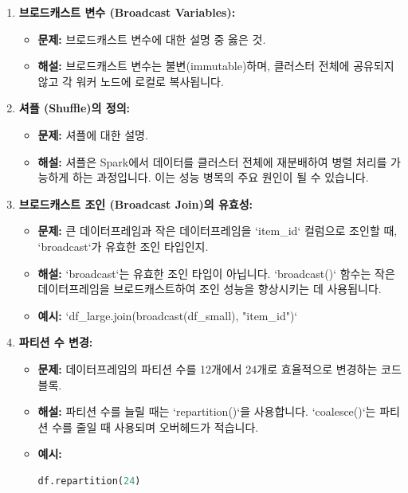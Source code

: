 \documentclass[11pt,a4paper]{article}
\begin{document}
\begin{enumerate}
    \item \textbf{브로드캐스트 변수 (Broadcast Variables):}
    \begin{itemize}
        \item \textbf{문제:} 브로드캐스트 변수에 대한 설명 중 옳은 것.
        \item \textbf{해설:} 브로드캐스트 변수는 불변(immutable)하며, 클러스터 전체에 공유되지 않고 각 워커 노드에 로컬로 복사됩니다.
    \end{itemize}

    \item \textbf{셔플 (Shuffle)의 정의:}
    \begin{itemize}
        \item \textbf{문제:} 셔플에 대한 설명.
        \item \textbf{해설:} 셔플은 Spark에서 데이터를 클러스터 전체에 재분배하여 병렬 처리를 가능하게 하는 과정입니다. 이는 성능 병목의 주요 원인이 될 수 있습니다.
    \end{itemize}

    \item \textbf{브로드캐스트 조인 (Broadcast Join)의 유효성:}
    \begin{itemize}
        \item \textbf{문제:} 큰 데이터프레임과 작은 데이터프레임을 `item_id` 컬럼으로 조인할 때, `broadcast`가 유효한 조인 타입인지.
        \item \textbf{해설:} `broadcast`는 유효한 조인 타입이 아닙니다. `broadcast()` 함수는 작은 데이터프레임을 브로드캐스트하여 조인 성능을 향상시키는 데 사용됩니다.
        \item \textbf{예시:} `df_large.join(broadcast(df_small), "item_id")`
    \end{itemize}

    \item \textbf{파티션 수 변경:}
    \begin{itemize}
        \item \textbf{문제:} 데이터프레임의 파티션 수를 12개에서 24개로 효율적으로 변경하는 코드 블록.
        \item \textbf{해설:} 파티션 수를 늘릴 때는 `repartition()`을 사용합니다. `coalesce()`는 파티션 수를 줄일 때 사용되며 오버헤드가 적습니다.
        \item \textbf{예시:}
        \begin{lstlisting}[language=Python, caption=repartition 예시]
df.repartition(24)
        \end{lstlisting}
    \end{itemize}


\end{enumerate}
\end{document}
